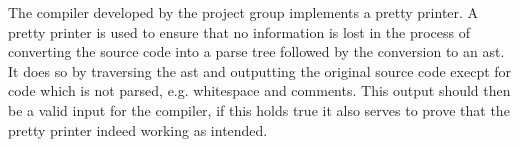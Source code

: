 The compiler developed by the project group implements a pretty printer.
A pretty printer is used to ensure that no information is lost in the process of converting the source code into a parse tree followed by the conversion to an \acrshort{ast}.
It does so by traversing the \acrshort{ast} and outputting the original source code execpt for code which is not parsed, e.g. whitespace and comments.
This output should then be a valid input for the compiler, if this holds true it also serves to prove that the pretty printer indeed working as intended.